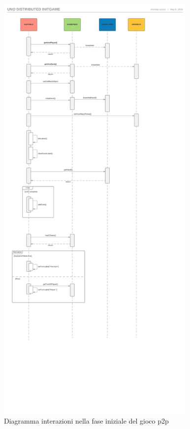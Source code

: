 \documentclass[10pt,a4paper]{article}
\begin{document}
\begin{figure}[H]
\begin{center}
\includegraphics[height=22cm, keepaspectratio]{initgame.png}
\caption{Diagramma interazioni nella fase iniziale del gioco p2p}
\end{center}
\end{figure}
\end{document}

